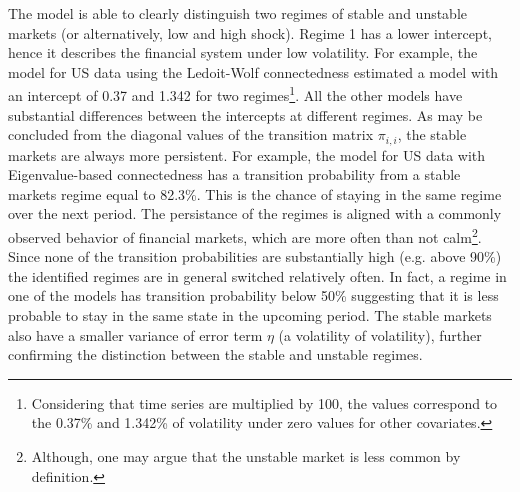 \documentclass[12pt]{article}
\begin{document}
The model is able to clearly distinguish two regimes of stable and unstable markets (or alternatively, low and high shock). Regime 1 has a lower intercept, hence it describes the financial system under low volatility.   For example, the model for US data using the Ledoit-Wolf connectedness estimated a model with an intercept of 0.37 and 1.342 for two regimes\footnote{Considering that time series are multiplied by 100, the values correspond to the 0.37\% and 1.342\% of volatility under zero values for other covariates.}. All the other models have substantial differences between the intercepts at different regimes. As may be concluded from the diagonal values of the transition matrix $\pi_{i,i}$, the stable markets are always more persistent. For example, the model for US data with Eigenvalue-based connectedness has a transition probability from a stable markets regime equal to 82.3\%. This is the chance of staying in the same regime over the next period. The persistance of the regimes is aligned with a commonly observed behavior of financial markets, which are more often than not calm\footnote{Although, one may argue that the unstable market is less common by definition.}. Since none of the transition probabilities are substantially high (e.g. above 90\%) the identified regimes are in general switched relatively often. In fact, a regime in one of the models has transition probability below 50\% suggesting that it is less probable to stay in the same state in the upcoming period. The stable markets also have a smaller variance of error term $\eta$ (a volatility of volatility), further confirming the distinction between the stable and unstable regimes. 
\end{document}
